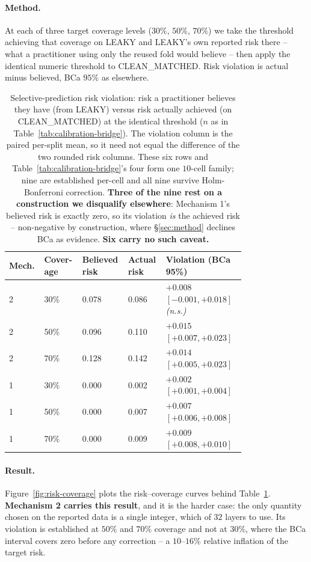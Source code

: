 \documentclass{article}
\begin{document}
\paragraph{Method.} At each of three target coverage levels ($30\%$, $50\%$,
$70\%$) we take the threshold achieving that coverage on LEAKY and LEAKY's own
reported risk there -- what a practitioner using only the reused fold would
believe -- then apply the identical numeric threshold to CLEAN\_MATCHED. Risk
violation is actual minus believed, BCa $95\%$ as elsewhere.

\begin{table}[t]
\centering
\small
{\setlength{\tabcolsep}{3pt}
\begin{tabular}{@{}p{0.08\linewidth}p{0.13\linewidth}p{0.13\linewidth}p{0.12\linewidth}p{0.32\linewidth}@{}}
\toprule
Mech. & Cover-\newline age & Believed risk & Actual risk & Violation (BCa 95\%) \\
\midrule
2 & 30\% & 0.078 & 0.086 & $+0.008$ $[-0.001,+0.018]$ \emph{(n.s.)} \\
2 & 50\% & 0.096 & 0.110 & $+0.015$ $[+0.007,+0.023]$ \\
2 & 70\% & 0.128 & 0.142 & $+0.014$ $[+0.005,+0.023]$ \\
1 & 30\% & $0.000$ & 0.002 & $+0.002$ $[+0.001,+0.004]$ \\
1 & 50\% & $0.000$ & 0.007 & $+0.007$ $[+0.006,+0.008]$ \\
1 & 70\% & $0.000$ & 0.009 & $+0.009$ $[+0.008,+0.010]$ \\
\bottomrule
\end{tabular}}
\caption{Selective-prediction risk violation: risk a practitioner believes
they have (from LEAKY) versus risk actually achieved (on CLEAN\_MATCHED) at
the identical threshold ($n$ as in Table~\ref{tab:calibration-bridge}). The
violation column is the paired per-split mean, so it need not equal the
difference of the two rounded risk columns. These six rows and
Table~\ref{tab:calibration-bridge}'s four form one $10$-cell family; nine are
established per-cell and all nine survive Holm-Bonferroni correction.
\textbf{Three of the nine rest on a construction we disqualify elsewhere}:
Mechanism 1's believed risk is exactly zero, so its violation \emph{is} the
achieved risk -- non-negative by construction, where \S\ref{sec:method}
declines BCa as evidence. \textbf{Six carry no such caveat.}}
\label{tab:selective-prediction}
\end{table}

\paragraph{Result.} Figure~\ref{fig:risk-coverage} plots the risk--coverage
curves behind Table~\ref{tab:selective-prediction}.
\textbf{Mechanism 2 carries this result}, and it is the
harder case: the only quantity chosen on the reported data is a single
integer, which of $32$ layers to use. Its violation is established at $50\%$ and
$70\%$ coverage and not at $30\%$, where the BCa interval covers zero before
any correction -- a $10$--$16\%$ relative inflation of the target risk.
\end{document}

